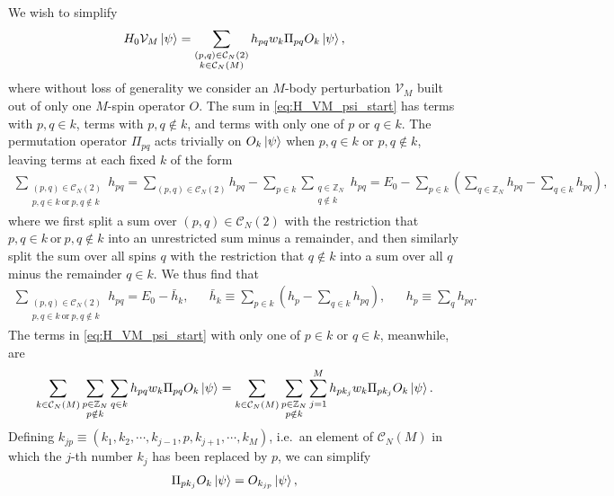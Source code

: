 \documentclass[nofootinbib,notitlepage,11pt]{revtex4-2}
\renewcommand{\t}{\text} %
\newcommand{\p}[1]{\left(#1\right)} %
\newcommand{\1}{\mathds{1}}
\newcommand{\C}{\mathcal{C}}
\newcommand{\V}{\mathcal{V}}
\newcommand{\ZZ}{\mathbb{Z}}
\begin{document}
We wish to simplify
\begin{align}
  H_0 \V_M \ket\psi
  = \sum_{\substack{\p{p,q}\in\C_N\p{2}\\k\in\C_N\p{M}}} h_{pq} w_k
  \Pi_{pq} O_k \ket\psi,
  \label{eq:H_VM_psi_start}
\end{align}
where without loss of generality we consider an $M$-body perturbation
$\V_M$ built out of only one $M$-spin operator $O$.  The sum in
\eqref{eq:H_VM_psi_start} has terms with $p,q\in k$, terms with
$p,q\notin k$, and terms with only one of $p$ or $q\in k$.  The
permutation operator $\Pi_{pq}$ acts trivially on $O_k\ket\psi$ when
$p,q\in k$ or $p,q\notin k$, leaving terms at each fixed $k$ of the
form
\begin{align}
  \sum_{\substack{\p{p,q}\in\C_N\p{2}\\p,q\in k~\t{or}~p,q\notin k}} h_{pq}
  = \sum_{\p{p,q}\in\C_N\p{2}} h_{pq}
  - \sum_{p\in k} \sum_{\substack{q\in\ZZ_N\\q\notin k}} h_{pq}
  = E_0 - \sum_{p\in k}
  \p{\sum_{q\in\ZZ_N} h_{pq} - \sum_{q\in k} h_{pq}},
\end{align}
where we first split a sum over $\p{p,q}\in\C_N\p{2}$ with the
restriction that $p,q\in k~\t{or}~p,q\notin k$ into an unrestricted
sum minus a remainder, and then similarly split the sum over all spins
$q$ with the restriction that $q\notin k$ into a sum over all $q$
minus the remainder $q\in k$.  We thus find that
\begin{align}
  \sum_{\substack{\p{p,q}\in\C_N\p{2}\\p,q\in k~\t{or}~p,q\notin k}} h_{pq}
  = E_0 - \bar h_k,
  &&
  \bar h_k \equiv \sum_{p\in k}\p{h_p - \sum_{q\in k}h_{pq}},
  &&
  h_p \equiv \sum_q h_{pq}.
\end{align}
The terms in \eqref{eq:H_VM_psi_start} with only one of $p\in k$ or
$q\in k$, meanwhile, are
\begin{align}
  \sum_{k\in\C_N\p{M}} \sum_{\substack{p\in\ZZ_N\\p\notin k}} \sum_{q\in k}
  h_{pq} w_k \Pi_{pq} O_k \ket\psi
  = \sum_{k\in\C_N\p{M}} \sum_{\substack{p\in\ZZ_N\\p\notin k}}
  \sum_{j=1}^M h_{p k_j} w_k \Pi_{p k_j} O_k \ket\psi.
\end{align}
Defining
$k_{jp}\equiv\p{k_1,k_2,\cdots,k_{j-1},p,k_{j+1},\cdots,k_M}$, i.e.~an
element of $\C_N\p{M}$ in which the $j$-th number $k_j$ has been
replaced by $p$, we can simplify
\begin{align}
  \Pi_{p k_j} O_k \ket\psi = O_{k_{jp}}\ket\psi,
\end{align}
\end{document}

